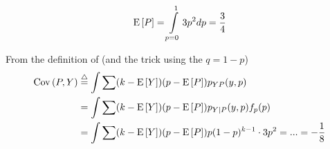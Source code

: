 \documentclass[a4paper,twoside=false,abstract=false,numbers=noenddot,
titlepage=false,headings=small,parskip=half,version=last]{scrartcl}
\begin{document}
\begin{solution}
    \begin{equation}
        {\rm E}\,[P] = \int\limits_{p=0}^1 3p^2dp = \frac{3}{4}
    \end{equation}

    From the definition of \CoVariance  (and the trick using the $q = 1-p$)
    \begin{align}
        \CoVariance(P, Y) & \eqdef
            \int\sum (k - \Expected[Y])(p - \Expected[P]) p_{YP}(y, p)%
            \nonumber \\& =
            \int\sum (k - \Expected[Y])(p - \Expected[P]) p_{Y|P}(y, p)f_p(p)%
            \nonumber \\& =
             \int\sum (k - \Expected[Y])(p - \Expected[P]) p(1-p)^{k-1} \cdot
             3p^2
        = ... = %
        -\frac{1}{8}
    \end{align}

\end{solution}
\pagebreak

\end{document}
